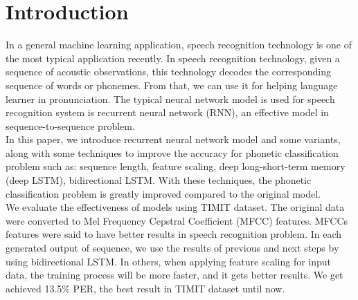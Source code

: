 \documentclass[conference]{IEEEtran}
\begin{document}
\section{Introduction}

In a general machine learning application, speech recognition technology is one of the most typical application recently. In speech recognition technology, given a sequence of acoustic observations, this technology decodes the corresponding sequence of words or phonemes. From that, we can use it for helping language learner in pronunciation. The typical neural network model is used for speech recognition system is recurrent neural network (RNN), an effective model in sequence-to-sequence problem.\\
In this paper, we introduce recurrent neural network model and some variants, along with some techniques to improve the accuracy for phonetic classification problem such as: sequence length, feature scaling, deep long-short-term memory (deep LSTM), bidirectional LSTM. With these techniques, the phonetic classification problem is greatly improved compared to the original model.\\
We evaluate the effectiveness of models using TIMIT dataset. The original data were converted to Mel Frequency Cepstral Coefficient (MFCC) features. MFCCs features were said to have better results in speech recognition problem. In each generated output of sequence, we use the results of previous and next steps by using bidirectional LSTM. In others, when applying feature scaling for input data, the training process will be more faster, and it gets better results. We get achieved 13.5\% PER, the best result in TIMIT dataset until now. 


%
%
\end{document}
